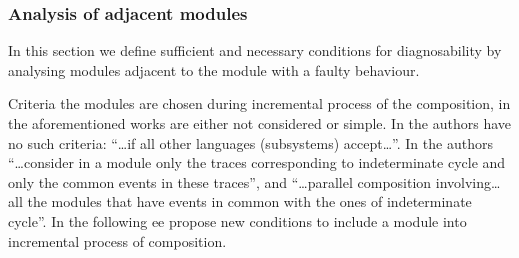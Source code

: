 \documentclass[a4paper,oneside]{article}
\begin{document}


\subsubsection{Analysis of adjacent modules}
In this section we define sufficient and necessary conditions for diagnosability
by analysing modules adjacent to the module with a faulty behaviour.

Criteria the modules are chosen during incremental process of
the composition, in the aforementioned works are either not considered or
simple. In \cite{debouk_modular_2002} the authors have no such criteria: 
``\ldots if all other languages (subsystems) accept\ldots''.
In \cite{contant_diagnosability_2006} the authors ``\ldots consider in a module
only the traces corresponding to indeterminate cycle and only the common events
in these traces'', and ``\ldots parallel composition involving\ldots all the
modules that have events in common with the ones of indeterminate cycle''.
In the following ee propose new conditions to include a module into incremental
process of composition.


\end{document}
